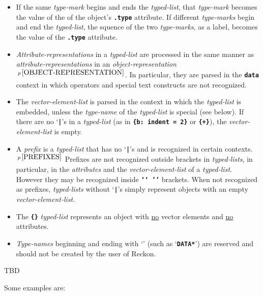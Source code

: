 \documentclass[12pt]{article}
\newcommand{\TT}[1]{{\tt \bfseries #1}}
\newcommand{\pagnote}[1]{$\,^{p\,\pageref{#1}}$}
\newenvironment{indpar}[1][0.3in]%
	{\begin{list}{}%
		     {\setlength{\itemsep}{0in}%
		      \setlength{\topsep}{0in}%
		      \setlength{\parsep}{1ex}%
		      \setlength{\labelwidth}{#1}%
		      \setlength{\leftmargin}{#1}%
		      \addtolength{\leftmargin}{\labelsep}}%
	 \item}%
	{\end{list}}
\begin{document}
\begin{indpar}[0.2in]
\begin{itemize}
\item If the same {\em type-mark} begins and ends the
{\em typed-list}, that {\em type-mark} becomes the value of the
of the object's \TT{.type} attribute.
If different {\em type-marks}
begin and end the {\em typed-list}, the squence of the two
{\em type-marks}, as a label, becomes the value of the \TT{.type}
attribute.

\item {\em Attribute-representations} in a {\em typed-list} are processed
in the same manner as {\em attribute-representations} in an
{\em object-representation}\pagnote{OBJECT-REPRESENTATION}.
In particular, they are parsed in the \TT{data} context in which
operators and special text constructs are not recognized.

\item The {\em vector-element-list}
is parsed in the context in which the {\em typed-list} is embedded,
unless the {\em type-name} of the {\em typed-list} is special (see
below).  If there are no `\TT{|}'s  in a {\em typed-list} (as in
\TT{\{b: indent = 2\}} or \TT{\{+\}}), the
{\em vector-element-list} is empty.

\item A {\em prefix} is a {\em typed-list} that has
no `\TT{|}'s and is recognized in certain contexts.\pagnote{PREFIXES}
Prefixes are not recognized outside brackets in {\em typed-lists},
in particular, in the
{\em attributes} and the {\em vector-element-list} of a {\em typed-list}.
However they may be recognized inside \TT{`{}`~'{}'} brackets.
When not recognized as prefixes, {\em typed-lists} without `\TT{|}'s
simply represent objects
with an empty {\em vector-element-list}.

\item The \TT{\{\}} {\em typed-list} represents an object with
\underline{no} vector elements and \underline{no} attributes.

\item {\em Type-names} beginning and ending with `\TT{*}'
(such as `\TT{*DATA*}') are reserved and should not be created by the
user of Reckon.

\end{itemize}
\end{indpar}

TBD


Some examples are:
\end{document}
